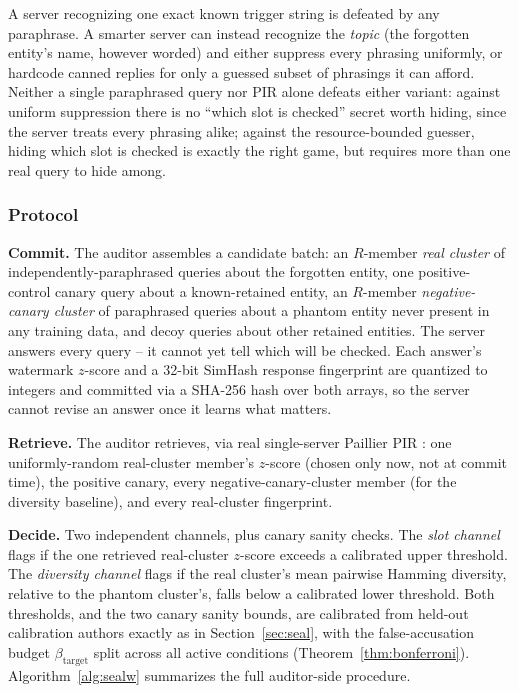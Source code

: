 \documentclass[10pt,journal,compsoc]{IEEEtran}
\begin{document}
A server recognizing one exact known trigger string is defeated by any paraphrase. A smarter server can instead recognize the \emph{topic} (the forgotten entity's name, however worded) and either suppress every phrasing uniformly, or hardcode canned replies for only a guessed subset of phrasings it can afford. Neither a single paraphrased query nor PIR alone defeats either variant: against uniform suppression there is no ``which slot is checked'' secret worth hiding, since the server treats every phrasing alike; against the resource-bounded guesser, hiding which slot is checked is exactly the right game, but requires more than one real query to hide among.

\subsubsection{Protocol}

\textbf{Commit.} The auditor assembles a candidate batch: an $R$-member \emph{real cluster} of independently-paraphrased queries about the forgotten entity, one positive-control canary query about a known-retained entity, an $R$-member \emph{negative-canary cluster} of paraphrased queries about a phantom entity never present in any training data, and decoy queries about other retained entities. The server answers every query -- it cannot yet tell which will be checked. Each answer's watermark $z$-score \cite{kirchenbauer2023watermark} and a 32-bit SimHash response fingerprint \cite{charikar2002simhash} are quantized to integers and committed via a SHA-256 hash over both arrays, so the server cannot revise an answer once it learns what matters.

\textbf{Retrieve.} The auditor retrieves, via real single-server Paillier PIR \cite{paillier1999}: one uniformly-random real-cluster member's $z$-score (chosen only now, not at commit time), the positive canary, every negative-canary-cluster member (for the diversity baseline), and every real-cluster fingerprint.

\textbf{Decide.} Two independent channels, plus canary sanity checks. The \emph{slot channel} flags if the one retrieved real-cluster $z$-score exceeds a calibrated upper threshold. The \emph{diversity channel} flags if the real cluster's mean pairwise Hamming diversity, relative to the phantom cluster's, falls below a calibrated lower threshold. Both thresholds, and the two canary sanity bounds, are calibrated from held-out calibration authors exactly as in Section~\ref{sec:seal}, with the false-accusation budget $\beta_{\text{target}}$ split across all active conditions (Theorem~\ref{thm:bonferroni}). Algorithm~\ref{alg:sealw} summarizes the full auditor-side procedure.
\end{document}
